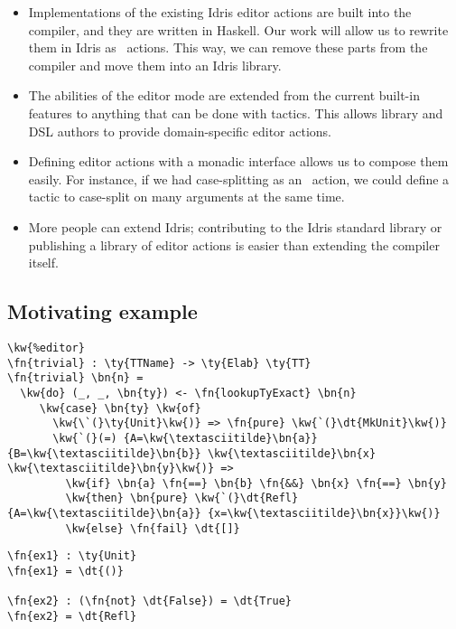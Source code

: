 \begin{itemize}
\item Implementations of the existing Idris editor actions are
built into the compiler, and they are written in Haskell. Our work will allow
us to rewrite them in Idris as \Elab\ actions. This way, we can remove these
parts from the compiler and move them into an Idris library.
\item The abilities of the editor mode are extended from the
current built-in features to anything that can be done with tactics. This
allows library and DSL authors to provide domain-specific editor actions.
\item Defining editor actions with a monadic interface allows us to
compose them easily. For instance, if we had case-splitting as an
\Elab\ action, we could define a tactic to case-split on many arguments at the
same time.
\item More people can extend Idris; contributing to the Idris standard library
  or publishing a library of editor actions is easier than extending the
    compiler itself.
\end{itemize}


\subsection{Motivating example}


\begin{Verbatim}
\kw{%editor}
\fn{trivial} : \ty{TTName} -> \ty{Elab} \ty{TT}
\fn{trivial} \bn{n} =
  \kw{do} (_, _, \bn{ty}) <- \fn{lookupTyExact} \bn{n}
     \kw{case} \bn{ty} \kw{of}
       \kw{\`(}\ty{Unit}\kw{)} => \fn{pure} \kw{`(}\dt{MkUnit}\kw{)}
       \kw{`(}(=) {A=\kw{\textasciitilde}\bn{a}} {B=\kw{\textasciitilde}\bn{b}} \kw{\textasciitilde}\bn{x} \kw{\textasciitilde}\bn{y}\kw{)} =>
         \kw{if} \bn{a} \fn{==} \bn{b} \fn{&&} \bn{x} \fn{==} \bn{y}
         \kw{then} \bn{pure} \kw{`(}\dt{Refl} {A=\kw{\textasciitilde}\bn{a}} {x=\kw{\textasciitilde}\bn{x}}\kw{)}
         \kw{else} \fn{fail} \dt{[]}
\end{Verbatim}


\begin{Verbatim}
\fn{ex1} : \ty{Unit}
\fn{ex1} = \dt{()}

\fn{ex2} : (\fn{not} \dt{False}) = \dt{True}
\fn{ex2} = \dt{Refl}
\end{Verbatim}



